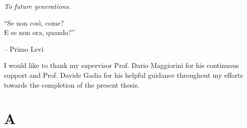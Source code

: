 \documentclass[12pt,british]{report}
\begin{document}
\renewcommand\contentsname{Index}
\frontespizio
\beforepreface

{
\raggedleft \large \sl To future generations.\\
	
	\vspace{2cm}
	
	``Se non così, come?\\E se non ora, quando?''
	
	\bigskip
	
	\--- Primo Levi\\
}
         
% 
%


%
%

I would like to thank my supervisor Prof. Dario Maggiorini for his continuous support and Prof. Davide Gadia for his helpful guidance throughout my efforts towards the completion of the present thesis.

%
%

\afterpreface

















% 
% 

\appendix

\chapter{A}


%
%



\end{document}
